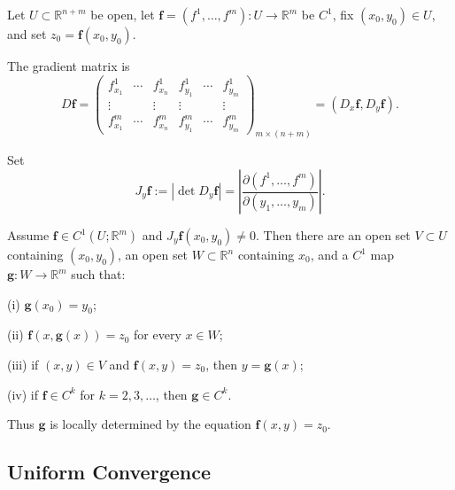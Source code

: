 Let $U\subset\mathbb R^{n+m}$ be open, let $\mathbf f=(f^1,\ldots,f^m):U\to\mathbb R^m$ be $C^1$, fix $(x_0,y_0)\in U$, and set $z_0=\mathbf f(x_0,y_0)$.

\begin{definition}
\label{def:gradient-matrix-df-rectangular-notation}

The gradient matrix is
\[
D\mathbf f
=\begin{pmatrix}
f^1_{x_1}&\cdots&f^1_{x_n}&f^1_{y_1}&\cdots&f^1_{y_m}\\
\vdots&&\vdots&\vdots&&\vdots\\
f^m_{x_1}&\cdots&f^m_{x_n}&f^m_{y_1}&\cdots&f^m_{y_m}
\end{pmatrix}_{m\times(n+m)}
=(D_x\mathbf f,D_y\mathbf f).
\]
\end{definition}

\begin{definition}
\label{def:jacobian-jyf}

Set
\[
J_y\mathbf f
:=|\det D_y\mathbf f|
=\left|\frac{\partial(f^1,\ldots,f^m)}
{\partial(y_1,\ldots,y_m)}\right|.
\]
\end{definition}

\begin{theorem}
\label{thm:implicit-function-theorem}

Assume $\mathbf f\in C^1(U;\mathbb R^m)$ and $J_y\mathbf f(x_0,y_0)\ne0$. Then there are an open set $V\subset U$ containing $(x_0,y_0)$, an open set $W\subset\mathbb R^n$ containing $x_0$, and a $C^1$ map $\mathbf g:W\to\mathbb R^m$ such that:

(i) $\mathbf g(x_0)=y_0$;

(ii) $\mathbf f(x,\mathbf g(x))=z_0$ for every $x\in W$;

(iii) if $(x,y)\in V$ and $\mathbf f(x,y)=z_0$, then $y=\mathbf g(x)$;

(iv) if $\mathbf f\in C^k$ for $k=2,3,\ldots$, then $\mathbf g\in C^k$.

Thus $\mathbf g$ is locally determined by the equation $\mathbf f(x,y)=z_0$.
\end{theorem}

\subsection{Uniform Convergence}

